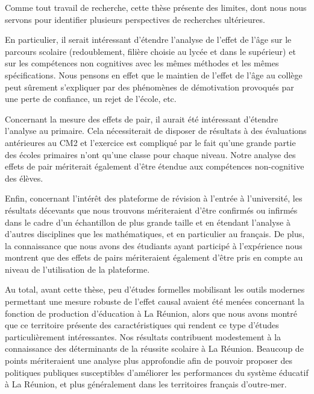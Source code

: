\documentclass[
]{book}
\begin{document}
\quad Comme tout travail de recherche, cette thèse présente des limites, dont nous nous servons pour identifier plusieurs perspectives de recherches ultérieures.

En particulier, il serait intéressant d'étendre l'analyse de l'effet de l'âge sur le parcours scolaire (redoublement, filière choisie au lycée et dans le supérieur) et sur les compétences non cognitives avec les mêmes méthodes et les mêmes spécifications. Nous pensons en effet que le maintien de l'effet de l'âge au collège peut sûrement s'expliquer par des phénomènes de démotivation provoqués par une perte de confiance, un rejet de l'école, etc.

Concernant la mesure des effets de pair, il aurait été intéressant d'étendre l'analyse au primaire. Cela nécessiterait de disposer de résultats à des évaluations antérieures au CM2 et l'exercice est compliqué par le fait qu'une grande partie des écoles primaires n'ont qu'une classe pour chaque niveau. Notre analyse des effets de pair mériterait également d'être étendue aux compétences non-cognitive des élèves.

Enfin, concernant l'intérêt des plateforme de révision à l'entrée à l'université, les résultats décevants que nous trouvons mériteraient d'être confirmés ou infirmés dans le cadre d'un échantillon de plus grande taille et en étendant l'analyse à d'autres disciplines que les mathématiques, et en particulier au français. De plus, la connaissance que nous avons des étudiants ayant participé à l'expérience nous montrent que des effets de pairs mériteraient également d'être pris en compte au niveau de l'utilisation de la plateforme.

\quad Au total, avant cette thèse, peu d'études formelles mobilisant les outils modernes permettant une mesure robuste de l'effet causal avaient été menées concernant la fonction de production d'éducation à La Réunion, alors que nous avons montré que ce territoire présente des caractéristiques qui rendent ce type d'études particulièrement intéressantes. Nos résultats contribuent modestement à la connaissance des déterminants de la réussite scolaire à La Réunion. Beaucoup de points mériteraient une analyse plus approfondie afin de pouvoir proposer des politiques publiques susceptibles d'améliorer les performances du système éducatif à La Réunion, et plus généralement dans les territoires français d'outre-mer.

\hypertarget{appendix-annexes}{%
\appendix}


\newpage
\end{document}
